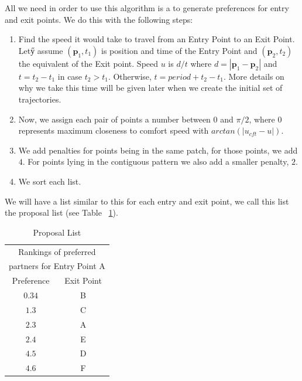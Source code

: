 All we need in order to use this algorithm is a to generate preferences for entry and exit points. We do this with the following steps:
\begin{enumerate}
  \item Find the speed it would take to travel from an Entry Point to an Exit Point.  Letӳ assume $(\mathbf{p}_1, t_1)$ is position and time of the Entry Point and $(\mathbf{p}_2,t_2)$ the equivalent of the Exit point. Speed $u$ is $d/t$ where $d=|\mathbf{p}_1-\mathbf{p}_2|$ and $t=t_2-t_1$ in case $t_2>t_1$. Otherwise, $t=period+t_2-t_1$. More details on why we take this time will be given later when we create the initial set of trajectories.
  \item Now, we assign each pair of points a number between $0$ and $\pi/2$, where $0$ represents maximum closeness to comfort speed with $arctan(|u_{cft} -u|)$.
  \item We add penalties for points being in the same patch, for those points, we add $4$. For points lying in the contiguous pattern we also add a smaller penalty, $2$.
  \item We sort each list.
\end{enumerate}
 
We will have a list similar to this for each entry and exit point, we call this list the proposal list (see Table ~\ref{tab:proposal-list}).

\begin{table}[b]
	\caption{Proposal List}
	\begin{tabular}{|c|c|}
		\multicolumn{2}{c}{Rankings of preferred}\\
		\multicolumn{2}{c}{partners for Entry Point A}\\
		\hline
		Preference	& Exit Point\\
		\hline\hline
		$0.34$		&	B\\
		$1.3$		&	C\\
		$2.3$		&	A\\
		$2.4$		&	E\\
		$4.5$		&	D\\
		$4.6$		&	F\\
		\hline
		\end{tabular}
	\label{tab:proposal-list}
\end{table}


